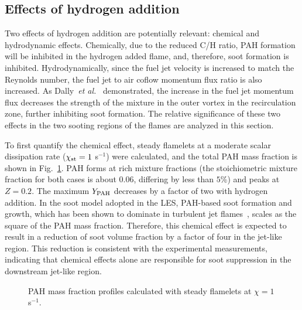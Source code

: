 \documentclass[review,3p,times]{elsarticle}
\begin{document}
\subsection{Effects of hydrogen addition}

Two effects of hydrogen addition are potentially relevant: chemical and hydrodynamic effects.  Chemically, due to the reduced C/H ratio, PAH formation will be inhibited in the hydrogen added flame, and, therefore, soot formation is inhibited.  Hydrodynamically, since the fuel jet velocity is increased to match the Reynolds number, the fuel jet to air coflow momentum flux ratio is also increased.  As Dally~\emph{et al.}~\cite{dally98b} demonstrated, the increase in the fuel jet momentum flux decreases the strength of the mixture in the outer vortex in the recirculation zone, further inhibiting soot formation.  The relative significance of these two effects in the two sooting regions of the flames are analyzed in this section.

To first quantify the chemical effect, steady flamelets at a moderate scalar dissipation rate ($\chi_{\rm st} = 1$ s$^{-1}$) were calculated, and the total PAH mass fraction is shown in Fig.~\ref{fig:flamelet}.  PAH forms at rich mixture fractions (the stoichiometric mixture fraction for both cases is about $0.06$, differing by less than $5$\%) and peaks at $Z = 0.2$.  The maximum $Y_{\rm PAH}$ decreases by a factor of two with hydrogen addition.  In the soot model adopted in the LES, PAH-based soot formation and growth, which has been shown to dominate in turbulent jet flames~\cite{bisetti12,attili14,attili15,mueller12,mueller13}, scales as the square of the PAH mass fraction.  Therefore, this chemical effect is expected to result in a reduction of soot volume fraction by a factor of four in the jet-like region.  This reduction is consistent with the experimental measurements, indicating that chemical effects alone are responsible for soot suppression in the downstream jet-like region.

\begin{figure}[t]
  \centering
  \scriptsize
  \resizebox{0.5\textwidth}{!}{}
  \normalsize
  \vspace{-0.3in}
  \caption{PAH mass fraction profiles calculated with steady flamelets at $\chi = 1$ s$^{-1}$.}
  \label{fig:flamelet}
\end{figure}
\end{document}
